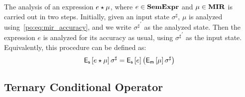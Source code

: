 The analysis of an expression $e \mathbin{\star} \mu$, where $e \in \mathbf{SemExpr}$ and $\mu
\in \mathbf{MIR}$ is carried out in two steps.  Initially, given an input state
$\sigma^\sharp$, $\mu$ is analyzed using~\eqref{po:eq:mir_accuracy}, and we
write ${\sigma^\sharp}^\prime$ as the analyzed state.  Then the expression $e$
is analyzed for its accuracy as usual, using ${\sigma^\sharp}^\prime$ as the
input state.  Equivalently, this procedure can be defined as:
\begin{equation}
    \operatorname{\mathsf{E}_\mathsf{s}}\left[{e \mathbin{\star} \mu}\right]{\sigma^\sharp}
    = \operatorname{\mathsf{E}_\mathsf{s}}\left[{e}\right]{\left( \ensuremath{\operatorname{\mathsf{E}_\mathsf{m}}}\left[{\mu}\right]{\sigma^\sharp} \right)}
\end{equation}

\subsection{Ternary Conditional Operator}

